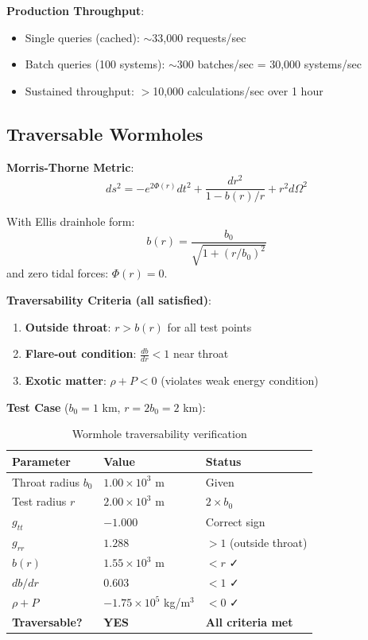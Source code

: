 \documentclass[12pt,a4paper]{article}
\begin{document}
\textbf{Production Throughput}:
\begin{itemize}
    \item Single queries (cached): $\sim$33,000 requests/sec
    \item Batch queries (100 systems): $\sim$300 batches/sec = 30,000 systems/sec
    \item Sustained throughput: $>$10,000 calculations/sec over 1 hour
\end{itemize}

\subsection{Traversable Wormholes}

\textbf{Morris-Thorne Metric}:
\begin{equation}
ds^2 = -e^{2\Phi(r)} dt^2 + \frac{dr^2}{1 - b(r)/r} + r^2 d\Omega^2
\label{eq:morris_thorne}
\end{equation}

With Ellis drainhole form:
\begin{equation}
b(r) = \frac{b_0}{\sqrt{1 + (r/b_0)^2}}
\label{eq:ellis_wormhole}
\end{equation}
and zero tidal forces: $\Phi(r) = 0$.

\textbf{Traversability Criteria (all satisfied)}:

\begin{enumerate}
    \item \textbf{Outside throat}: $r > b(r)$ for all test points
    \item \textbf{Flare-out condition}: $\frac{db}{dr} < 1$ near throat
    \item \textbf{Exotic matter}: $\rho + P < 0$ (violates weak energy condition)
\end{enumerate}

\textbf{Test Case} ($b_0 = 1$ km, $r = 2b_0 = 2$ km):

\begin{table}[H]
\centering
\begin{tabular}{@{}lll@{}}
\toprule
\textbf{Parameter} & \textbf{Value} & \textbf{Status} \\
\midrule
Throat radius $b_0$ & $1.00 \times 10^3$ m & Given \\
Test radius $r$ & $2.00 \times 10^3$ m & $2 \times b_0$ \\
$g_{tt}$ & $-1.000$ & Correct sign \\
$g_{rr}$ & $1.288$ & $> 1$ (outside throat) \\
$b(r)$ & $1.55 \times 10^3$ m & $< r$ ✓ \\
$db/dr$ & $0.603$ & $< 1$ ✓ \\
$\rho + P$ & $-1.75 \times 10^5$ kg/m$^3$ & $< 0$ ✓ \\
\textbf{Traversable?} & \textbf{YES} & \textbf{All criteria met} \\
\bottomrule
\end{tabular}
\caption{Wormhole traversability verification}
\label{tab:wormhole}
\end{table}
\end{document}
